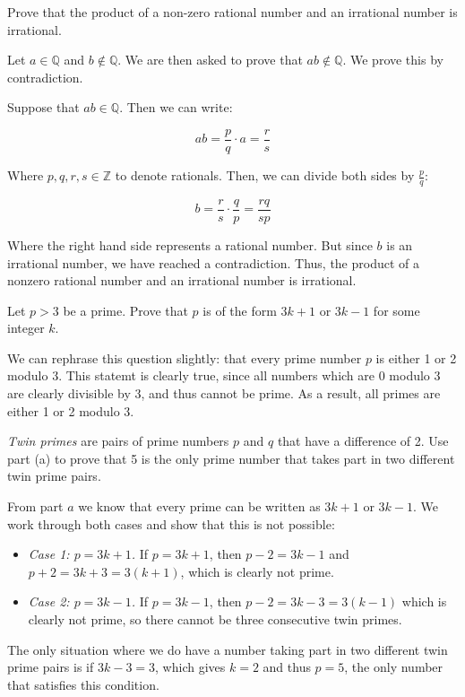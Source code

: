 \documentclass[11pt]{article}
\begin{document}
Prove that the product of a non-zero rational number and an irrational number is irrational.

\begin{solution}
    Let $a \in \mathbb Q$ and $b \notin \mathbb Q$. We are then asked to prove that $ab \notin \mathbb Q$. We prove this by contradiction.

    Suppose that $ab \in \mathbb Q$. Then we can write:

    \[ ab = \frac{p}{q} \cdot a = \frac{r}{s}\]

    Where $p, q, r, s \in \mathbb Z$ to denote rationals. Then, we can divide both sides by $\frac{p}{q}$:

    \[ b = \frac{r}{s} \cdot \frac{q}{p} = \frac{rq}{sp}\] 

    Where the right hand side represents a rational number. But since $b$ is an irrational number, we have reached a contradiction. Thus, the product of a nonzero rational number and an irrational number is irrational.
\end{solution}


\begin{Parts}

\Part
Let $p > 3$ be a prime. Prove that $p$ is of the form $3k + 1$ or $3k-1$ for some integer $k$.

\begin{solution} 
    We can rephrase this question slightly: that every prime number $p$ is either 1 or 2 modulo 3. This statemt is clearly true, since all numbers which are $0$ modulo 3 are clearly divisible by 3, and thus cannot be prime. As a result, all primes are either 1 or 2 modulo 3. 
\end{solution} 

\Part
\textit{Twin primes} are pairs of prime numbers $p$ and $q$ that have a difference of 2. Use part (a) to prove that 5 is the only prime number that takes part in two different twin prime pairs.

\begin{solution}
   From part $a$ we know that every prime can be written as $3k + 1$ or $3k - 1$. We work through both cases and show that this is not possible:

   \begin{itemize}
        \item \textit{Case 1: $p = 3k + 1$.} If $p = 3k + 1$, then $p - 2 = 3k - 1$ and $p + 2 = 3k+3 = 3(k+1)$, which is clearly not prime.
        \item \textit{Case 2: $p = 3k-1$.} If $p = 3k-1$, then $p - 2 = 3k - 3 = 3(k-1)$ which is clearly not prime, so there cannot be three consecutive twin primes.
   \end{itemize}

   The only situation where we do have a number taking part in two different twin prime pairs is if $3k - 3 = 3$, which gives $k = 2$ and thus $p = 5$, the only number that satisfies this condition.
\end{solution}

\end{Parts}
\end{document}
